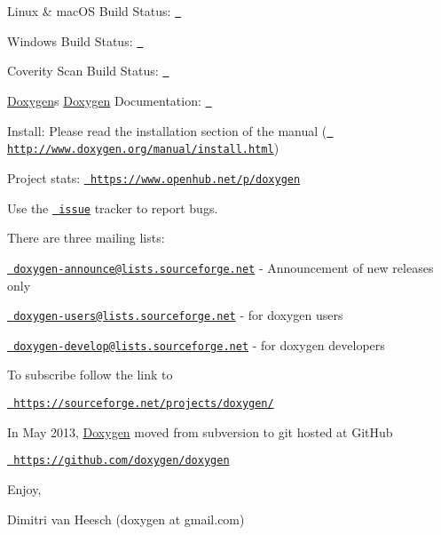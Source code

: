 \begin{DoxyItemize}
\item Linux \& mac\+OS Build Status\+: \href{https://travis-ci.org/doxygen/doxygen}{\texttt{ }}
\item Windows Build Status\+: \href{https://ci.appveyor.com/project/doxygen/doxygen}{\texttt{ }}
\item Coverity Scan Build Status\+: \href{https://scan.coverity.com/projects/2860}{\texttt{  }}
\item \mbox{\hyperlink{class_doxygen}{Doxygen}}\textquotesingle{}s \mbox{\hyperlink{class_doxygen}{Doxygen}} Documentation\+: \href{https://codedocs.xyz/doxygen/doxygen/}{\texttt{ }}
\item Install\+: Please read the installation section of the manual (\href{http://www.doxygen.org/manual/install.html}{\texttt{ http\+://www.\+doxygen.\+org/manual/install.\+html}})
\item Project stats\+: \href{https://www.openhub.net/p/doxygen}{\texttt{ https\+://www.\+openhub.\+net/p/doxygen}}
\end{DoxyItemize}

Use the \href{https://github.com/doxygen/doxygen/issues}{\texttt{ issue}} tracker to report bugs.

There are three mailing lists\+:


\begin{DoxyItemize}
\item \href{mailto:doxygen-announce@lists.sourceforge.net}{\texttt{ doxygen-\/announce@lists.\+sourceforge.\+net}} -\/ Announcement of new releases only
\item \href{mailto:doxygen-users@lists.sourceforge.net}{\texttt{ doxygen-\/users@lists.\+sourceforge.\+net}} -\/ for doxygen users
\item \href{mailto:doxygen-develop@lists.sourceforge.net}{\texttt{ doxygen-\/develop@lists.\+sourceforge.\+net}} -\/ for doxygen developers
\item To subscribe follow the link to
\begin{DoxyItemize}
\item \href{https://sourceforge.net/projects/doxygen/}{\texttt{ https\+://sourceforge.\+net/projects/doxygen/}}
\end{DoxyItemize}
\end{DoxyItemize}

In May 2013, \mbox{\hyperlink{class_doxygen}{Doxygen}} moved from subversion to git hosted at Git\+Hub
\begin{DoxyItemize}
\item \href{https://github.com/doxygen/doxygen}{\texttt{ https\+://github.\+com/doxygen/doxygen}}
\end{DoxyItemize}

Enjoy,

Dimitri van Heesch (doxygen at gmail.\+com) 